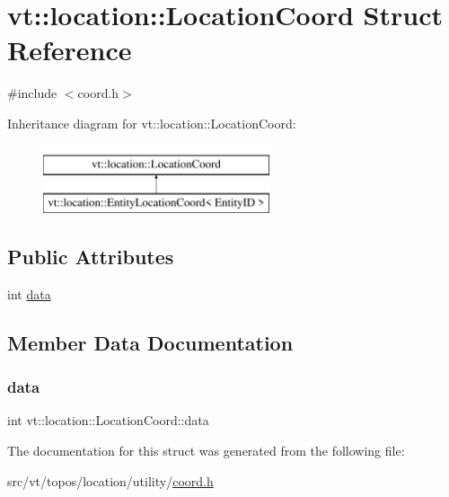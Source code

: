 \hypertarget{structvt_1_1location_1_1_location_coord}{}\section{vt\+:\+:location\+:\+:Location\+Coord Struct Reference}
\label{structvt_1_1location_1_1_location_coord}


{\ttfamily \#include $<$coord.\+h$>$}

Inheritance diagram for vt\+:\+:location\+:\+:Location\+Coord\+:\begin{figure}[H]
\begin{center}
\leavevmode
\includegraphics[height=2.000000cm]{structvt_1_1location_1_1_location_coord}
\end{center}
\end{figure}
\subsection*{Public Attributes}
\begin{DoxyCompactItemize}
\item 
int \hyperlink{structvt_1_1location_1_1_location_coord_aa94c83bab2f01365b14852e7b80e6aec}{data}
\end{DoxyCompactItemize}


\subsection{Member Data Documentation}
\mbox{\label{structvt_1_1location_1_1_location_coord_aa94c83bab2f01365b14852e7b80e6aec}} 
\subsubsection{\texorpdfstring{data}{data}}
{\footnotesize\ttfamily int vt\+::location\+::\+Location\+Coord\+::data}



The documentation for this struct was generated from the following file\+:\begin{DoxyCompactItemize}
\item 
src/vt/topos/location/utility/\hyperlink{coord_8h}{coord.\+h}\end{DoxyCompactItemize}
